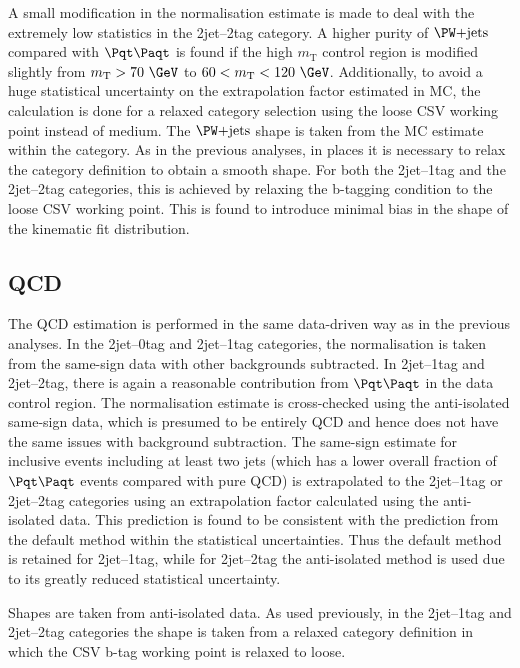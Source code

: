 A small modification in the normalisation estimate is made to deal with the
extremely low statistics in the 2jet--2tag category. A higher purity of $\WJets$
compared with $\ttbar$ is found if the high $m_{\text{T}}$ control region is modified
slightly from $m_{\text{T}}>70~\GeV$ to $60<m_{\text{T}}<120~\GeV$.
Additionally, to avoid a huge statistical uncertainty on the extrapolation
factor estimated in \ac{MC}, the calculation is done for a relaxed category
selection using the loose \ac{CSV} working point instead of medium. 
The $\WJets$ shape is taken from the \ac{MC} estimate within the category. As
in the previous analyses, in places it is necessary to relax the category
definition to obtain a smooth shape. For both the 2jet--1tag and the 2jet--2tag
categories, this is achieved by relaxing the b-tagging condition to the
loose \ac{CSV} working point. This is found to introduce minimal bias in the
shape of the kinematic fit distribution. 

\subsection{QCD}

The QCD estimation is performed in the same data-driven way as in the previous
analyses. In the 2jet--0tag and 2jet--1tag categories, the normalisation is
taken from the same-sign data with other backgrounds subtracted. In 2jet--1tag
and 2jet--2tag, there is again a reasonable contribution from $\ttbar$ in the
data control region. The normalisation estimate is cross-checked using the anti-isolated
same-sign data, which is presumed to be entirely QCD and hence does not have the
same issues with background subtraction. The same-sign estimate for inclusive
events including at least two jets (which has a lower overall fraction of $\ttbar$
events compared with pure QCD) is extrapolated to the 2jet--1tag or 2jet--2tag
categories using an extrapolation factor calculated using the anti-isolated
data. This prediction is found to be consistent with the prediction from the
default method within the statistical uncertainties. Thus the default method is
retained for 2jet--1tag, while for 2jet--2tag the anti-isolated method is
used due to its greatly reduced statistical uncertainty. 

Shapes are taken from anti-isolated data. As used previously, in the 2jet--1tag
and 2jet--2tag categories the shape is taken from a relaxed category definition
in which the \ac{CSV} b-tag working point is relaxed to loose.

